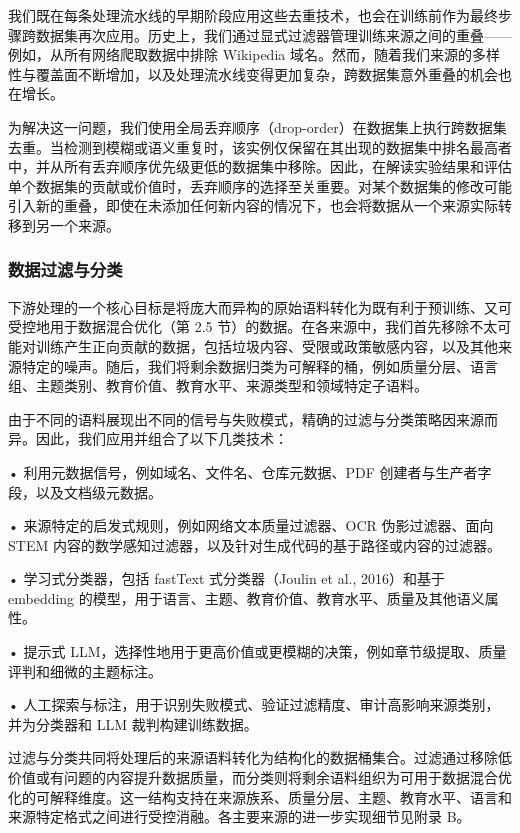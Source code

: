 \documentclass[
  10
]{article}
\begin{document}
我们既在每条处理流水线的早期阶段应用这些去重技术，也会在训练前作为最终步骤跨数据集再次应用。历史上，我们通过显式过滤器管理训练来源之间的重叠——例如，从所有网络爬取数据中排除 Wikipedia 域名。然而，随着我们来源的多样性与覆盖面不断增加，以及处理流水线变得更加复杂，跨数据集意外重叠的机会也在增长。

为解决这一问题，我们使用全局丢弃顺序（drop-order）在数据集上执行跨数据集去重。当检测到模糊或语义重复时，该实例仅保留在其出现的数据集中排名最高者中，并从所有丢弃顺序优先级更低的数据集中移除。因此，在解读实验结果和评估单个数据集的贡献或价值时，丢弃顺序的选择至关重要。对某个数据集的修改可能引入新的重叠，即使在未添加任何新内容的情况下，也会将数据从一个来源实际转移到另一个来源。

\subsubsection{数据过滤与分类}\label{filtering-and-categorization-of-data}

下游处理的一个核心目标是将庞大而异构的原始语料转化为既有利于预训练、又可受控地用于数据混合优化（第 2.5 节）的数据。在各来源中，我们首先移除不太可能对训练产生正向贡献的数据，包括垃圾内容、受限或政策敏感内容，以及其他来源特定的噪声。随后，我们将剩余数据归类为可解释的桶，例如质量分层、语言组、主题类别、教育价值、教育水平、来源类型和领域特定子语料。

由于不同的语料展现出不同的信号与失败模式，精确的过滤与分类策略因来源而异。因此，我们应用并组合了以下几类技术：

• 利用元数据信号，例如域名、文件名、仓库元数据、PDF 创建者与生产者字段，以及文档级元数据。

• 来源特定的启发式规则，例如网络文本质量过滤器、OCR 伪影过滤器、面向 STEM 内容的数学感知过滤器，以及针对生成代码的基于路径或内容的过滤器。

• 学习式分类器，包括 fastText 式分类器（Joulin et al., 2016）和基于 embedding 的模型，用于语言、主题、教育价值、教育水平、质量及其他语义属性。

• 提示式 LLM，选择性地用于更高价值或更模糊的决策，例如章节级提取、质量评判和细微的主题标注。

• 人工探索与标注，用于识别失败模式、验证过滤精度、审计高影响来源类别，并为分类器和 LLM 裁判构建训练数据。

过滤与分类共同将处理后的来源语料转化为结构化的数据桶集合。过滤通过移除低价值或有问题的内容提升数据质量，而分类则将剩余语料组织为可用于数据混合优化的可解释维度。这一结构支持在来源族系、质量分层、主题、教育水平、语言和来源特定格式之间进行受控消融。各主要来源的进一步实现细节见附录 B。
\end{document}
